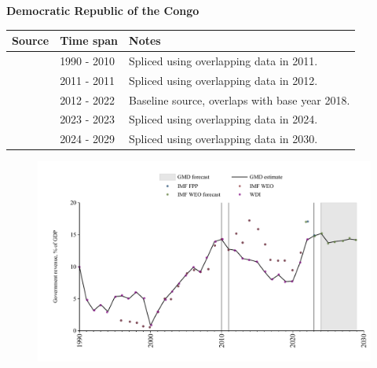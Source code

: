 \documentclass[12pt,a4paper,landscape]{article}
\begin{document}
\begin{adjustbox}{max totalsize={\paperwidth}{\paperheight},center}
\begin{minipage}[t][\textheight][t]{\textwidth}
\vspace*{0.5cm}
{}
\begin{center}
{\Large\bfseries Democratic Republic of the Congo}
\end{center}
\vspace{0.5cm}
\begin{table}[H]
\centering
\small
\begin{tabular}{|l|l|l|}
\hline
\textbf{Source} & \textbf{Time span} & \textbf{Notes} \\
\hline
\rowcolor{white}\cite{WDI}& 1990 - 2010 &Spliced using overlapping data in 2011.\\
\rowcolor{lightgray}\cite{IMF_WEO}& 2011 - 2011 &Spliced using overlapping data in 2012.\\
\rowcolor{white}\cite{WDI}& 2012 - 2022 &Baseline source, overlaps with base year 2018.\\
\rowcolor{lightgray}\cite{IMF_FPP}& 2023 - 2023 &Spliced using overlapping data in 2024.\\
\rowcolor{white}\cite{IMF_WEO_forecast}& 2024 - 2029 &Spliced using overlapping data in 2030.\\
\hline
\end{tabular}
\end{table}
\begin{figure}[H]
\centering
\includegraphics[width=\textwidth,height=0.6\textheight,keepaspectratio]{graphs/COD_govrev_GDP.pdf}
\end{figure}
\end{minipage}
\end{adjustbox}
\end{document}
